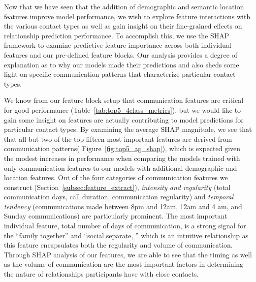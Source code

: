 \documentclass[acmlarge]{acmart}
\begin{document}
Now that we have seen that the addition of demographic and semantic location features improve model performance, we wish to explore feature interactions with the various contact types as well as gain insight on their fine-grained effects on relationship prediction performance. To accomplish this, we use the SHAP framework to examine predictive feature importance across both individual features and our pre-defined feature blocks. Our analysis provides a degree of explanation as to why our models made their predictions and also sheds some light on specific communication patterns that characterize particular contact types.







We know from our feature block setup that communication features are critical for good performance (Table~\ref{tab:top5_4class_metrics}), but we would like to gain some insight on features are actually contributing to model predictions for particular contact types. By examining the average SHAP magnitude, we see that that all but two of the top fifteen most important features are derived from communication patterns( Figure~\ref{fig:top5_ag_shap}), which is expected given the modest increases in performance when comparing the models trained with only communication features to our models with additional demographic and location features. Out of the four categories of communication features we construct (Section~\ref{subsec:feature_extract}), \textit{intensity and regularity} (total communication days, call duration, communication regularity) and \textit{temporal tendency} (communications made between 8pm and 12am, 12am and 4 am, and Sunday communications) are particularly prominent. The most important individual feature, total number of days of communication, is a strong signal for the ``family together'' and ``social separate, '' which is an intuitive relationship as this feature encapsulates both the regularity and volume of communication.  Through SHAP analysis of our features, we are able to see that the timing as well as the volume of communication are the most important factors in determining the nature of relationships participants have with close contacts.
\end{document}
